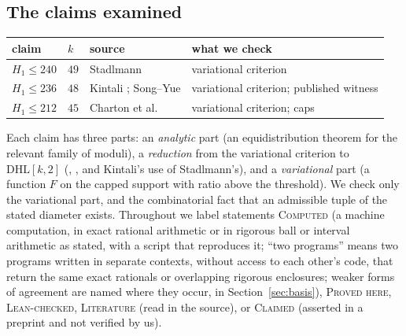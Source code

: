 \documentclass[11pt]{amsart}
\theoremstyle{definition}
\theoremstyle{remark}
\newcommand{\lbl}[1]{\textup{\textsc{#1}}}
\newcommand{\DHL}{\mathrm{DHL}}
\begin{document}
\subsection*{The claims examined}
\begin{center}
\begin{tabular}{@{}llll@{}}
\toprule
claim & $k$ & source & what we check\\
\midrule
$H_1\le240$ & $49$ & Stadlmann \cite{Sta26} & variational criterion\\
$H_1\le236$ & $48$ & Kintali \cite{Kin26}; Song--Yue \cite{SY26} & variational criterion; published witness\\
$H_1\le212$ & $45$ & Charton et al.\ \cite{Cha26} & variational criterion; caps\\
\bottomrule
\end{tabular}
\end{center}
Each claim has three parts: an \emph{analytic} part (an equidistribution
theorem for the relevant family of moduli), a \emph{reduction} from the
variational criterion to $\DHL[k,2]$ (\cite[Prop.~1]{Sta26},
\cite[\S\S4.12--4.14]{SY26}, \cite[Thm.~4.10]{Cha26} and Kintali's use of
Stadlmann's), and a \emph{variational} part (a function $F$ on the capped
support with ratio above the threshold). We check only the variational part, and the combinatorial fact that an admissible
tuple of the stated diameter exists. Throughout we label statements
\lbl{Computed} (a machine computation, in exact rational arithmetic or in
rigorous ball or interval arithmetic as stated, with a script that reproduces
it; ``two programs'' means two programs written in separate contexts, without
access to each other's code, that return the same exact rationals or
overlapping rigorous enclosures; weaker forms of agreement are named where they
occur, in Section~\ref{sec:basis}),
\lbl{Proved here}, \lbl{Lean-checked}, \lbl{Literature} (read in the source),
or \lbl{Claimed} (asserted in a preprint and not verified by us).
\end{document}

